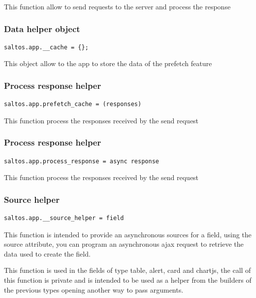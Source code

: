 \documentclass[a4paper]{article}
\begin{document}
This function allow to send requests to the server and process the response

\hypertarget{toc9}{}
\subsubsection{Data helper object}

\begin{lstlisting}
saltos.app.__cache = {};
\end{lstlisting}

This object allow to the app to store the data of the prefetch feature

\hypertarget{toc10}{}
\subsubsection{Process response helper}

\begin{lstlisting}
saltos.app.prefetch_cache = (responses)
\end{lstlisting}

This function process the responses received by the send request

\hypertarget{toc11}{}
\subsubsection{Process response helper}

\begin{lstlisting}
saltos.app.process_response = async response
\end{lstlisting}

This function process the responses received by the send request

\hypertarget{toc12}{}
\subsubsection{Source helper}

\begin{lstlisting}
saltos.app.__source_helper = field
\end{lstlisting}

This function is intended to provide an asynchronous sources for a field, using the source attribute,
you can program an asynchronous ajax request to retrieve the data used to create the field.

This function is used in the fields of type table, alert, card and chartjs, the call of this function
is private and is intended to be used as a helper from the builders of the previous types opening
another way to pass arguments.
\end{document}
